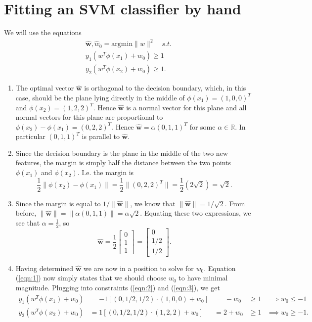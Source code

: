\documentclass{article}
\newcommand{\bbm}{\begin{bmatrix}}
\newcommand{\ebm}{\end{bmatrix}}
\newcommand{\R}{\mathbb{R}}
\begin{document}
\section{Fitting an SVM classifier by hand}
We will use the equations
\begin{align}
	\bm{\hat w},\hat w_0 =\mathrm{argmin}\|w\|^2 \quad s.t. \label{eqn:1}\\
	y_1(w^T\phi(x_1)+w_0)\geq 1 \label{eqn:2}\\
	y_2(w^T\phi(x_2)+w_0)\geq 1. \label{eqn:3}
\end{align}
\begin{enumerate}
	\item The optimal vector $\bm{\hat w}$ is orthogonal to the decision boundary, which, in this case, should be the plane lying directly in the middle of $\phi(x_1) = (1,0,0)^T$ and $\phi(x_2)=(1,2,2)^T$. Hence $\bm{\hat w}$ is a normal vector for this plane and all normal vectors for this plane are proportional to $\phi(x_2)-\phi(x_1) = (0,2,2)^T$. Hence $\bm{\hat w} = \alpha (0,1,1)^T$ for some $\alpha\in\R$. In particular $(0,1,1)^T$ is parallel to $\bm{\hat w}$.
	\item Since the decision boundary is the plane in the middle of the two new features, the margin is simply half the distance between the two points $\phi(x_1)$ and $\phi(x_2)$. I.e. the margin is
	\[
		\frac12 \|\phi(x_2)-\phi(x_1)\| = \frac12 \|(0,2,2)^T\| = \frac12 (2\sqrt{2}) = \sqrt{2}.
	\]
	\item Since the margin is equal to $1/\|\bm{\hat w}\|$, we know that $\|\bm{\hat w}\|= 1 / \sqrt{2}$. From before, $\|\bm{\hat w}\| = \|\alpha(0,1,1)\| = \alpha\sqrt{2}$. Equating these two expressions, we see that $\alpha = \tfrac12$, so
	\[
		\bm{\hat w} = \frac12\bbm0\\1\\1\ebm = \bbm 0\\ 1/2 \\ 1/2 \ebm.
	\]
	\item Having determined $\bm{\hat w}$ we are now in a position to solve for $w_0$. Equation (\ref{eqn:1}) now simply states that we should choose $w_0$ to have minimal magnitude. Plugging into constraints (\ref{eqn:2}) and (\ref{eqn:3}), we get
	\begin{align*}
		y_1(w^T\phi(x_1)+w_0) &= -1[(0,1/2,1/2)\cdot(1,0,0)+w_0] &=~ -w_0 & \geq1 &\implies w_0\leq -1 \\
		y_2(w^T\phi(x_2)+w_0) &= 1[(0,1/2,1/2)\cdot(1,2,2)+w_0] &= 2+w_0 & \geq 1 &\implies w_0\geq -1.
	\end{align*}

\end{enumerate}
\end{document}
